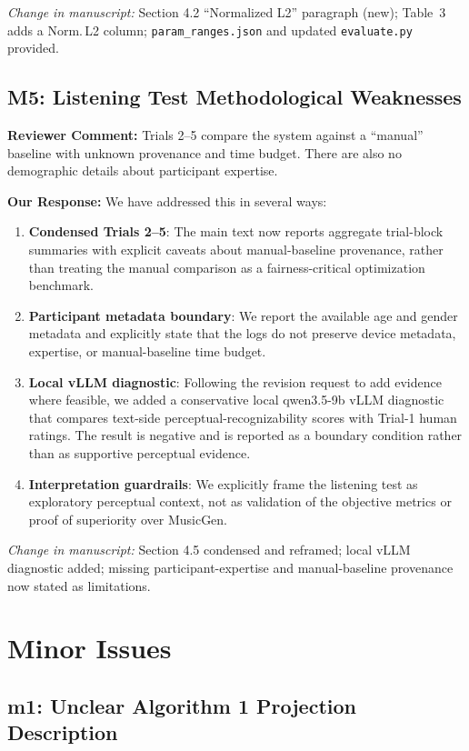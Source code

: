 \documentclass[11pt]{article}
\newcommand{\reviewer}[1]{\textcolor{reviewercolor}{\textbf{Reviewer Comment:} #1}}
\newcommand{\response}[1]{\textcolor{responsecolor}{\textbf{Our Response:} #1}}
\newcommand{\change}[1]{\textit{Change in manuscript:} #1}
\begin{document}
\change{Section 4.2 ``Normalized L2'' paragraph (new); Table~3 adds a Norm.\,L2 column; \texttt{param\_ranges.json} and updated \texttt{evaluate.py} provided.}

\subsection*{M5: Listening Test Methodological Weaknesses}

\reviewer{Trials 2--5 compare the system against a ``manual'' baseline with unknown provenance and time budget. There are also no demographic details about participant expertise.}

\response{We have addressed this in several ways:}

\begin{enumerate}[leftmargin=*]
\item \textbf{Condensed Trials 2--5}: The main text now reports aggregate trial-block summaries with explicit caveats about manual-baseline provenance, rather than treating the manual comparison as a fairness-critical optimization benchmark.
\item \textbf{Participant metadata boundary}: We report the available age and gender metadata and explicitly state that the logs do not preserve device metadata, expertise, or manual-baseline time budget.
\item \textbf{Local vLLM diagnostic}: Following the revision request to add evidence where feasible, we added a conservative local qwen3.5-9b vLLM diagnostic that compares text-side perceptual-recognizability scores with Trial-1 human ratings. The result is negative and is reported as a boundary condition rather than as supportive perceptual evidence.
\item \textbf{Interpretation guardrails}: We explicitly frame the listening test as exploratory perceptual context, not as validation of the objective metrics or proof of superiority over MusicGen.
\end{enumerate}

\change{Section 4.5 condensed and reframed; local vLLM diagnostic added; missing participant-expertise and manual-baseline provenance now stated as limitations.}

\section*{Minor Issues}

\subsection*{m1: Unclear Algorithm 1 Projection Description}
\end{document}
